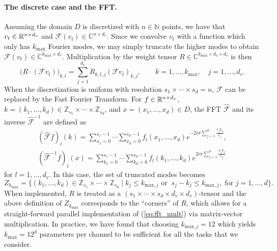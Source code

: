 \documentclass{article} %
\newcommand{\C}{\mathbb{C}}
\newcommand{\cG}{\mathcal{F}}
\newcommand{\bbZ}{\mathbb{Z}}
\begin{document}
\paragraph{The discrete case and the FFT.}
Assuming the domain $D$ is discretized with $n \in \mathbb{N}$ points, we have that $v_t \in \mathbb{R}^{n \times d_v}$ and $\cG (v_t) \in \C^{n \times d_v}$. Since we convolve $v_t$ with a function which only has $k_{\text{max}}$ Fourier modes, we may simply truncate the higher modes to obtain $\cG (v_t) \in \C^{k_{\text{max}} \times d_v}$. Multiplication by the weight tensor $R \in \C^{k_{\text{max}} \times d_v \times d_v}$ is then
\begin{equation}
\label{eq:fft_mult}
\bigl( R \cdot (\cG v_t) \bigr)_{k,l} = \sum_{j=1}^{d_v} R_{k,l,j}  (\cG v_t)_{k,j}, \qquad k=1,\dots,k_{\text{max}}, \quad j=1,\dots,d_v.
\end{equation}
When the discretization is uniform with resolution \(s_1 \times  \cdots \times s_d = n\), $\cG$ can be replaced by the Fast Fourier Transform. For $f \in \mathbb{R}^{n \times d_v}$,   $k = (k_1, \ldots, k_{d}) \in \bbZ_{s_1} \times \cdots \times \bbZ_{s_d}$, and $x=(x_1, \ldots, x_{d}) \in D$, the FFT $\hat{\cG}$ and its inverse $\hat{\cG}^{-1}$ are defined as
\begin{align*}
    (\hat{\cG} f)_l(k) = \sum_{x_1=0}^{s_1-1} \cdots \sum_{x_{d}=0}^{s_d-1} f_l(x_1, \ldots, x_{d}) e^{- 2i \pi \sum_{j=1}^{d} \frac{x_j k_j}{s_j} }, \\
    (\hat{\cG}^{-1} f)_l(x) = \sum_{k_1=0}^{s_1-1} \cdots \sum_{k_{d}=0}^{s_d-1} f_l(k_1, \ldots, k_{d}) e^{2i \pi \sum_{j=1}^{d} \frac{x_j k_j}{s_j} }
\end{align*}
for $l=1,\dots,d_v$. 
In this case, the set of truncated modes becomes
\[Z_{k_{\text{max}}} = \{(k_1, \ldots, k_{d}) \in \bbZ_{s_1} \times \cdots \times \bbZ_{s_d} \mid k_j \leq k_{\text{max},j} \text{ or }\ s_j-k_j \leq k_{\text{max},j}, \text{ for } j=1,\dots,d\}.\]
When implemented, $R$ is treated as a $(s_1 \times \cdots \times s_d \times d_v \times d_v)$-tensor and the above definition of $Z_{k_{\text{max}}}$ corresponds to the ``corners'' of $R$, which allows for a straight-forward parallel implementation of (\ref{eq:fft_mult}) via matrix-vector multiplication. 
In practice, we have found that choosing $k_{\text{max},j} = 12$  which yields $k_{\text{max}} = 12^d$ parameters per channel to be sufficient for all the tasks that we consider.
\end{document}
